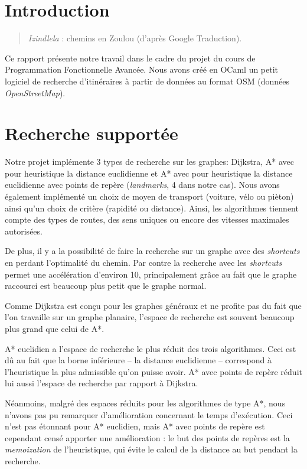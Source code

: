 \documentclass[a4paper, 11pt, DIV=12, numbers=enddot]{scrartcl}
\begin{document}
\section{Introduction}
\begin{quotation}
\emph{Izindlela} : chemins en Zoulou (d'après Google Traduction).
\end{quotation}

Ce rapport présente notre travail dans le cadre du projet du cours de Programmation Fonctionnelle Avancée.
Nous avons créé en OCaml un petit logiciel de recherche d'itinéraires à partir de données au format OSM (données \emph{OpenStreetMap}).
 
\section{Recherche supportée}

Notre projet implémente 3 types de recherche sur les graphes: Dijkstra, A* avec pour heuristique la distance euclidienne et A* avec pour heuristique la distance euclidienne avec points de repère (\emph{landmarks}, 4 dans notre cas). Nous avons également implémenté un choix de moyen de transport (voiture, vélo ou pièton)  ainsi qu'un choix de critère (rapidité ou distance). Ainsi, les algorithmes tiennent compte des types de routes, des sens uniques ou encore des vitesses maximales autorisées.\newline

De plus, il y a la possibilité de faire la recherche sur un graphe avec des \emph{shortcuts} en perdant l'optimalité du chemin. Par contre la recherche avec les \emph{shortcuts} permet une accélération d'environ 10, principalement grâce au fait que le graphe raccourci est beaucoup plus petit que le graphe normal.\newline

Comme Dijkstra est conçu pour les graphes généraux et ne profite pas du fait que l'on travaille sur un graphe planaire, l'espace de recherche est souvent beaucoup plus grand que celui de A*.

A* euclidien a l'espace de recherche le plus réduit des trois algorithmes.  Ceci est dû au fait que la borne inférieure -- la distance euclidienne -- correspond à l'heuristique \og la plus admissible \fg{} qu'on puisse avoir. A* avec points de repère réduit lui aussi l'espace de recherche par rapport à Dijkstra.\newline 

Néanmoins, malgré des espaces réduits pour les algorithmes de type A*, nous n'avons pas pu remarquer d'amélioration concernant le temps d'exécution. Ceci n'est pas étonnant pour A* euclidien, mais A* avec points de repère est cependant censé apporter une amélioration : le but des points de repères est la \emph{memoization} de l'heuristique, qui évite le calcul de la distance au but pendant la recherche.\newline
\end{document}
